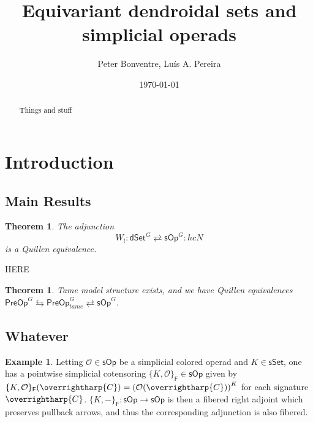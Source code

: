 \documentclass[a4paper,10pt
,draft
]{article}%
\title{Equivariant dendroidal sets and simplicial operads}
\author{Peter Bonventre, Lu\'is A. Pereira}%
\date{\today}
\numberwithin{equation}{section}
\numberwithin{figure}{section}
\newtheorem{theorem}[equation]{Theorem}%
\theoremstyle{definition} %
\newtheorem{example}[equation]{Example}%
\newcommand{\vect}[1]{\text{\overrightharp{\ensuremath{#1}}}}
\newcommand{\sOp}{\ensuremath{\mathsf{sOp}}}%
\newcommand{\dSet}{\mathsf{dSet}}
\renewcommand{\O}{\ensuremath{\mathcal O}}
\newcommand{\1}{\ensuremath{\mathbbm 1}}%
\begin{document}
\maketitle

\begin{abstract}
      Things and stuff
\end{abstract}

\tableofcontents


\section{Introduction}



\subsection{Main Results}



\begin{theorem}\label{QE THM}
The adjunction
\[
W_! \colon \dSet^G \rightleftarrows \sOp^G \colon hcN
\] is a Quillen equivalence.
\end{theorem}


{\color{blue} HERE}



\begin{theorem}
	Tame model structure exists, and we have Quillen equivalences
	$\mathsf{PreOp}^G \leftrightarrows \mathsf{PreOp}^G_{tame} \rightleftarrows \sOp^G$.
\end{theorem}





\subsection{Whatever}




\begin{example}
      \label{COTENS_EX}
      Letting $\mathcal{O} \in \mathsf{sOp}$ be a simplicial colored operad
      and $K \in \mathsf{sSet}$,
      one has a pointwise simplicial cotensoring
      $\{K,\O\}_{\mathsf{F}} \in \mathsf{sOp}$
      given by
      $\{K,\O\}_{\mathsf{F}}(\vect C) = 
      \left(\O(\vect C)\right)^K$
      for each signature $\vect C$.
      $\{K,-\}_{\mathsf{F}}\colon \mathsf{sOp} \to \mathsf{sOp}$
      is then a fibered right adjoint which preserves pullback arrows,
      and thus the corresponding adjunction is also fibered.
\end{example}
\end{document}
